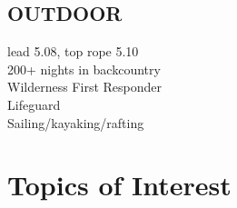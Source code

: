 \documentclass[a4paper]{deedy-resume} %
\begin{document}
    \begin{minipage}{0.24\textwidth}

        \subsection{OUTDOOR}
        
            \textbullet{} lead 5.08, top rope 5.10 \\
            \textbullet{} 200+ nights in backcountry \\
            \textbullet{} Wilderness First Responder\\
            \textbullet{} Lifeguard \\
            \textbullet{} Sailing/kayaking/rafting\\
    
    \end{minipage}
    
    \sectionspace %
    
    
    
    \section{Topics of Interest}
    
    
    
    
    
    
    
    
    
    
    
\end{document}
